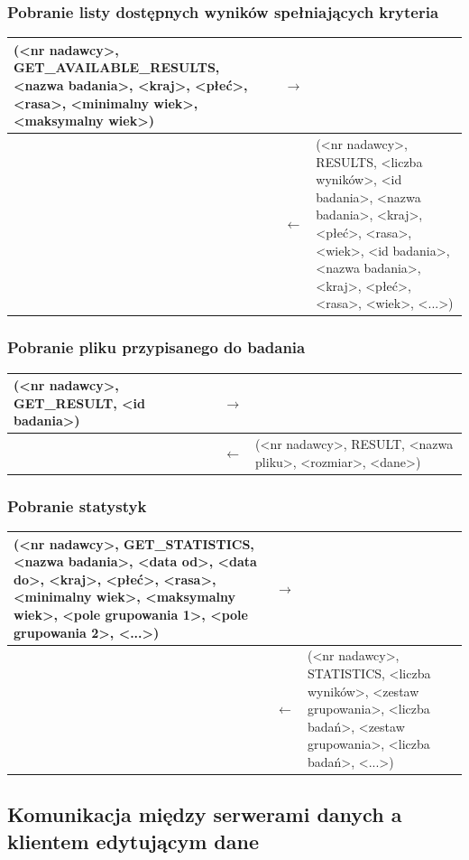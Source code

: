 \subsubsection{Pobranie listy dostępnych wyników spełniających kryteria}

\begin{longtable}{| p{} | p{}| p{} |} 
\hline
(<nr nadawcy>, GET\_AVAILABLE\_RESULTS, <nazwa badania>, <kraj>, <płeć>, <rasa>, <minimalny wiek>, <maksymalny wiek>) & $\rightarrow$ &  \\ \hline
 & $\leftarrow$ & (<nr nadawcy>, RESULTS, <liczba wyników>, <id badania>, <nazwa badania>, <kraj>, <płeć>, <rasa>, <wiek>, <id badania>, <nazwa badania>, <kraj>, <płeć>, <rasa>, <wiek>, <...>) \\ \hline
\end{longtable}

\subsubsection{Pobranie pliku przypisanego do badania}

\begin{longtable}{| p{} | p{}| p{} |} 
\hline
(<nr nadawcy>, GET\_RESULT, <id badania>) & $\rightarrow$ &  \\ \hline
 & $\leftarrow$ & (<nr nadawcy>, RESULT, <nazwa pliku>, <rozmiar>, <dane>) \\ \hline
\end{longtable}

\subsubsection{Pobranie statystyk}

\begin{longtable}{| p{} | p{}| p{} |} 
\hline
(<nr nadawcy>, GET\_STATISTICS, <nazwa badania>, <data od>, <data do>, <kraj>, <płeć>, <rasa>, <minimalny wiek>, <maksymalny wiek>, {<pole grupowania 1>, <pole grupowania 2>, <...>}) & $\rightarrow$ &  \\ \hline
 & $\leftarrow$ & (<nr nadawcy>, STATISTICS, <liczba wyników>, <zestaw grupowania>, <liczba badań>, <zestaw grupowania>, <liczba badań>, <...>) \\ \hline
\end{longtable}

\subsection{Komunikacja między serwerami danych a klientem edytującym dane}
